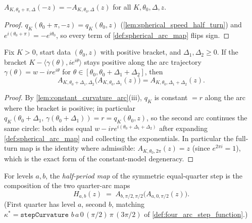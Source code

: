 \begin{lemma}
  \label{lem:arc_map_half_turn}
  $A_{K,\theta_0+\pi,\Delta}(-z)=-A_{K,\theta_0,\Delta}(z)$ for all
  $K,\theta_0,\Delta,z$.
\end{lemma}

\begin{proof}

\leanok
  $q_K(\theta_0+\pi,-z)=q_K(\theta_0,z)$ (\cref{lem:spherical_speed_half_turn}) and
  $e^{i(\theta_0+\pi)}=-e^{i\theta_0}$, so every term of
  \cref{def:spherical_arc_map} flips sign.
\end{proof}

\begin{lemma}
  \label{lem:arc_map_concat}
  Fix $K>0$, start data $(\theta_0,z)$ with positive bracket, and $\Delta_1,\Delta_2\ge0$.
  If the bracket $K-\langle \gamma(\theta),ie^{i\theta}\rangle$ stays positive along the arc
  trajectory $\gamma(\theta)=w-ire^{i\theta}$ for $\theta\in[\theta_0,\theta_0+\Delta_1+
  \Delta_2]$, then
  \[
    A_{K,\theta_0+\Delta_1,\Delta_2}\bigl(A_{K,\theta_0,\Delta_1}(z)\bigr)
    =A_{K,\theta_0,\Delta_1+\Delta_2}(z) .
  \]
\end{lemma}

\begin{proof}

\leanok
  By \cref{lem:constant_curvature_arc}(iii), $q_K$ is constant $=r$ along the arc where
  the bracket is positive; in particular
  $q_K(\theta_0+\Delta_1,\,\gamma(\theta_0+\Delta_1))=r=q_K(\theta_0,z)$, so the second arc
  continues the same circle: both sides equal $w-ire^{i(\theta_0+\Delta_1+\Delta_2)}$
  after expanding \cref{def:spherical_arc_map} and collecting the exponentials.
  In particular the full-turn map is the identity where admissible:
  $A_{K,\theta_0,2\pi}(z)=z$ (since $e^{2\pi i}=1$), which is the exact form of the
  constant-model degeneracy.
\end{proof}

\begin{definition}
  \label{def:step_half_map}
  For levels $a,b$, the \emph{half-period map} of the symmetric equal-quarter step is
  the composition of the two quarter-arc maps
  \[
    H_{a,b}(z)\;=\;A_{b,\pi/2,\pi/2}\bigl(A_{a,0,\pi/2}(z)\bigr) .
  \]
  (First quarter has level $a$, second $b$, matching
  $\kappa^\ast=\texttt{stepCurvature } b\,a\,0\,(\pi/2)\,\pi\,(3\pi/2)$ of
  \cref{def:four_arc_step_function}.)
\end{definition}

